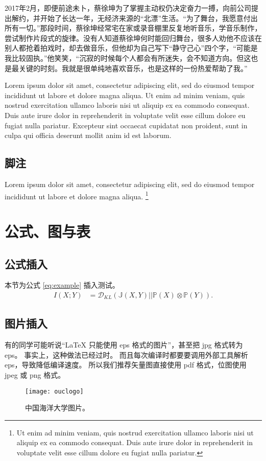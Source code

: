 \documentclass[pdf]{oucthesis}
\begin{document}
2017年2月，即便前途未卜，蔡徐坤为了掌握主动权仍决定奋力一搏，向前公司提出解约，并开始了长达一年，无经济来源的“北漂”生活。“为了舞台，我愿意付出所有一切。”那段时间，蔡徐坤经常宅在家或录音棚里反复地听音乐，学音乐制作，尝试制作片段式的旋律。没有人知道蔡徐坤何时能回归舞台，很多人劝他不应该在别人都抢着拍戏时，却去做音乐，但他却为自己写下“静守己心”四个字，“可能是我比较固执。”他笑笑，“沉寂的时候每个人都会有所迷失，会不知道方向。但这也是最关键的时刻。我就是很单纯地喜欢音乐，也是这样的一份热爱帮助了我。”

Lorem ipsum dolor sit amet, consectetur adipiscing elit, sed do eiusmod tempor
incididunt ut labore et dolore magna aliqua.
Ut enim ad minim veniam, quis nostrud exercitation ullamco laboris nisi ut
aliquip ex ea commodo consequat.
Duis aute irure dolor in reprehenderit in voluptate velit esse cillum dolore eu
fugiat nulla pariatur.
Excepteur sint occaecat cupidatat non proident, sunt in culpa qui officia
deserunt mollit anim id est laborum.

\section{脚注}

Lorem ipsum dolor sit amet, consectetur adipiscing elit, sed do eiusmod tempor
incididunt ut labore et dolore magna aliqua.
\footnote{Ut enim ad minim veniam, quis nostrud exercitation ullamco laboris
  nisi ut aliquip ex ea commodo consequat.
  Duis aute irure dolor in reprehenderit in voluptate velit esse cillum dolore
  eu fugiat nulla pariatur.}




\chapter{公式、图与表}
\section{公式插入}
本节为公式 \ref{eq:example} 插入测试。
\begin{equation}
\begin{split}
I(X;Y)&=\mathcal{D}_{KL}(\mathbb{J}(X,Y)||\mathbb{P}(X)\otimes\mathbb{P}(Y)).
\end{split}
\label{eq:example}
\end{equation}

\section{图片插入}
有的同学可能听说“\LaTeX{} 只能使用 eps 格式的图片”，甚至把 jpg 格式转为 eps。
事实上，这种做法已经过时。
而且每次编译时都要要调用外部工具解析 eps，导致降低编译速度。
所以我们推荐矢量图直接使用 pdf 格式，位图使用 jpeg 或 png 格式。
\begin{figure}[ht]
    \centering
	\texttt{[image: ouclogo]}
	\caption{中国海洋大学图片。}
	\label{fig:ouc}
\end{figure}
\end{document}
